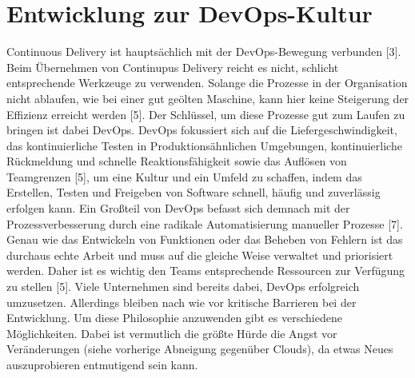 \section{Entwicklung zur DevOps-Kultur} \label{entwicklung}
Continuous Delivery ist hauptsächlich mit der DevOps-Bewegung verbunden [3]. Beim Übernehmen von Continupus Delivery reicht es nicht, schlicht entsprechende Werkzeuge zu verwenden. Solange die Prozesse in der Organisation nicht ablaufen, wie bei einer gut geölten Maschine, kann hier keine Steigerung der Effizienz erreicht werden [5]. Der Schlüssel, um diese Prozesse gut zum Laufen zu bringen ist dabei DevOps. 
DevOps fokussiert sich auf die Liefergeschwindigkeit, das kontinuierliche Testen in Produktionsähnlichen Umgebungen, kontinuierliche Rückmeldung und schnelle Reaktionsfähigkeit sowie das Auflösen von Teamgrenzen [5], um eine Kultur und ein Umfeld zu schaffen, indem das Erstellen, Testen und Freigeben von Software schnell, häufig und zuverlässig erfolgen kann. Ein Großteil von DevOps befasst sich demnach mit der Prozessverbesserung durch eine radikale Automatisierung manueller Prozesse [7]. Genau wie das Entwickeln von Funktionen oder das Beheben von Fehlern ist das durchaus echte Arbeit und muss auf die gleiche Weise verwaltet und priorisiert werden. Daher ist es wichtig den Teams entsprechende Ressourcen zur Verfügung zu stellen [5].
Viele Unternehmen sind bereits dabei, DevOps erfolgreich umzusetzen. Allerdings bleiben nach wie vor kritische Barrieren bei der Entwicklung. Um diese Philosophie anzuwenden gibt es verschiedene Möglichkeiten. Dabei ist vermutlich die größte Hürde die Angst vor Veränderungen (siehe vorherige Abneigung gegenüber Clouds), da etwas Neues auszuprobieren entmutigend sein kann. 
